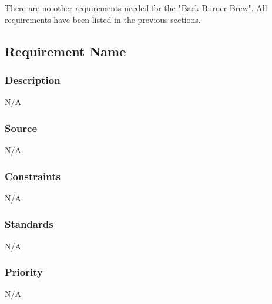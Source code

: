 There are no other requirements needed for the "Back Burner Brew". All requirements have been listed in the previous sections.


\subsection{Requirement Name}
\subsubsection{Description}
N/A
\subsubsection{Source}
N/A
\subsubsection{Constraints}
N/A
\subsubsection{Standards}
N/A
\subsubsection{Priority}
N/A